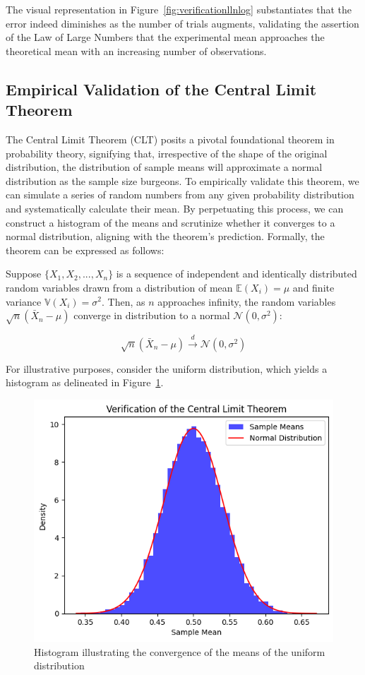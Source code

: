 \documentclass{article}
\begin{document}
The visual representation in Figure~\ref{fig:verificationllnlog} substantiates that the error indeed diminishes as the number of trials augments, validating the assertion of the Law of Large Numbers that the experimental mean approaches the theoretical mean with an increasing number of observations.

\subsection{Empirical Validation of the Central Limit Theorem}

The Central Limit Theorem (CLT) posits a pivotal foundational theorem in probability theory, signifying that, irrespective of the shape of the original distribution, the distribution of sample means will approximate a normal distribution as the sample size burgeons. To empirically validate this theorem, we can simulate a series of random numbers from any given probability distribution and systematically calculate their mean. By perpetuating this process, we can construct a histogram of the means and scrutinize whether it converges to a normal distribution, aligning with the theorem's prediction. Formally, the theorem can be expressed as follows:

\begin{theorem}
	Suppose \(\{X_1, X_2, ..., X_n\}\) is a sequence of independent and identically distributed random variables drawn from a distribution of mean \(\mathbb{E}(X_i) = \mu\) and finite variance \(\mathbb{V}(X_i) = \sigma^2\). Then, as \(n\) approaches infinity, the random variables \(\sqrt{n}(\bar{X}_n - \mu)\) converge in distribution to a normal \(\mathcal{N}(0, \sigma^2)\):

	\begin{equation}
		\sqrt{n}(\bar{X}_n - \mu) \xrightarrow{d} \mathcal{N}(0, \sigma^2)
	\end{equation}
\end{theorem}

For illustrative purposes, consider the uniform distribution, which yields a histogram as delineated in Figure~\ref{fig:verificationclt}.

\begin{figure}[H]
	\centering
	\includegraphics[width=0.5\linewidth]{./Figures/CLT/verif.png}
	\caption{Histogram illustrating the convergence of the means of the uniform distribution}
	\label{fig:verificationclt}
\end{figure}
\end{document}
